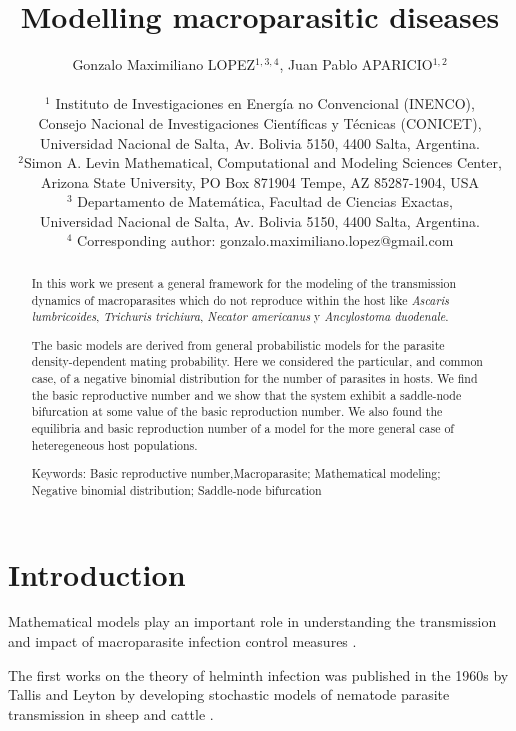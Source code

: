 \documentclass[12pt,a4paper]{article}
\title{Modelling macroparasitic diseases}
\author{Gonzalo Maximiliano LOPEZ$^{1,3,4}$, Juan Pablo APARICIO$^{1,2}$\\
	\\
	{\small $^1$ Instituto de Investigaciones en Energ\'ia no Convencional (INENCO),} \\ {\small Consejo Nacional de Investigaciones Cient\'ificas y T\'ecnicas (CONICET),}\\
	{\small Universidad Nacional de Salta, Av. Bolivia 5150, 4400 Salta, Argentina.}\\
	$^2${\small Simon A. Levin Mathematical, Computational and Modeling Sciences Center,} \\ {\small Arizona State University, PO Box 871904 Tempe, AZ 85287-1904, USA}\\
	{\small $^3$ Departamento de Matem\'atica, Facultad de Ciencias Exactas,}\\{\small Universidad Nacional de Salta, Av. Bolivia 5150, 4400 Salta, Argentina.}\\
	{\small $^4$ Corresponding author: gonzalo.maximiliano.lopez@gmail.com}}
\date{}
\theoremstyle{plain}%
\theoremstyle{definition}
\theoremstyle{remark}
\begin{document}
\maketitle
\begin{abstract}
	
	In this work we present a general framework for the modeling of the transmission dynamics of macroparasites which do not reproduce within the host like \textit{Ascaris lumbricoides}, \textit{Trichuris trichiura}, \textit{Necator americanus} y \textit{Ancylostoma duodenale}.  
	
	
	The basic models are derived from general probabilistic models for the parasite density-dependent mating probability. Here we considered the particular, and common case, of a negative binomial distribution for the number of parasites in hosts. We find the basic reproductive number  and we show that the system exhibit a saddle-node bifurcation at some value of the basic reproduction number. 
	 We also found the equilibria and basic reproduction number of a model for the more general case of heteregeneous host populations. 
	
	
	
%	
%	
%	
%	

	Keywords: Basic reproductive number,Macroparasite; Mathematical modeling; Negative binomial distribution; Saddle-node bifurcation 
\end{abstract}
\tableofcontents
\tableofcontents
\section{Introduction}
	
 	Mathematical models play an important role in understanding the transmission and impact of macroparasite infection control measures \cite{anderson1992infectious,anderson2014coverage,truscott2016soil}.

	The first works on the theory of helminth infection was published in the 1960s by Tallis and Leyton by developing stochastic models of nematode parasite transmission in sheep and cattle \cite{leyton1968stochastic,tallis1966stochastic,tallis1969stochastic}.
 	
\end{document}

